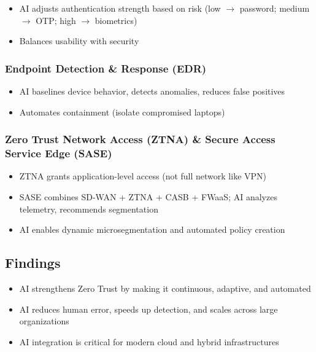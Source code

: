 \begin{itemize}
    \item AI adjusts authentication strength based on risk (low $\rightarrow$ password; medium $\rightarrow$ OTP; high $\rightarrow$ biometrics)
    \item Balances usability with security
\end{itemize}

\subsubsection{Endpoint Detection \& Response (EDR)}

\begin{itemize}
    \item AI baselines device behavior, detects anomalies, reduces false positives
    \item Automates containment (isolate compromised laptops)
\end{itemize}

\subsubsection{Zero Trust Network Access (ZTNA) \& Secure Access Service Edge (SASE)}

\begin{itemize}
    \item ZTNA grants application-level access (not full network like VPN)
    \item SASE combines SD-WAN + ZTNA + CASB + FWaaS; AI analyzes telemetry, recommends segmentation
    \item AI enables dynamic microsegmentation and automated policy creation
\end{itemize}

\subsection{Findings}

\begin{itemize}
    \item AI strengthens Zero Trust by making it continuous, adaptive, and automated
    \item AI reduces human error, speeds up detection, and scales across large organizations
    \item AI integration is critical for modern cloud and hybrid infrastructures
\end{itemize}

